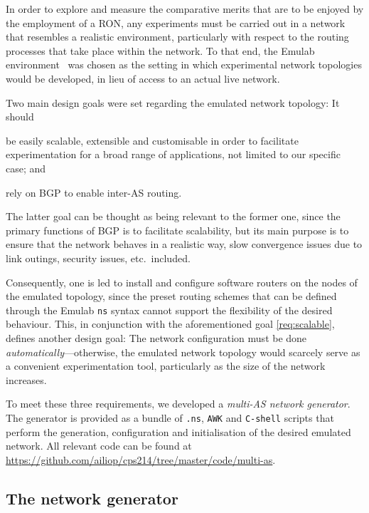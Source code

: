 In order to explore and measure the comparative merits that are to be
enjoyed by the employment of a RON, any experiments must be carried out in
a network that resembles a realistic environment, particularly with respect
to the routing processes that take place within the network. To that end,
the Emulab environment~\cite{Emulab} was chosen as the setting in which
experimental network topologies would be developed, in lieu of access to an
actual live network.

Two main design goals were set regarding the emulated network topology: It
should
\begin{inparaenum}[(a)]
\item \label{req:scalable}
  be easily scalable, extensible and customisable in order to facilitate
  experimentation for a broad range of applications, not limited to our
  specific case; and
\item \label{req:bgp}
  rely on BGP to enable inter-AS routing. 
\end{inparaenum}
The latter goal can be thought as being relevant to the former one, since
the primary functions of BGP is to facilitate scalability, but its main
purpose is to ensure that the network behaves in a realistic way, slow
convergence issues due to link outings, security issues, etc.\ included.

Consequently, one is led to install and configure software routers on the
nodes of the emulated topology, since the preset routing schemes that can
be defined through the Emulab \texttt{ns} syntax cannot support the
flexibility of the desired behaviour. This, in conjunction with the
aforementioned goal \cref{req:scalable}, defines another design goal: The
network configuration must be done \emph{automatically}---otherwise, the
emulated network topology would scarcely serve as a convenient
experimentation tool, particularly as the size of the network increases.

To meet these three requirements, we developed a \emph{multi-AS network
  generator}. The generator is provided as a bundle of \texttt{.ns},
\texttt{AWK} and \texttt{C-shell} scripts that perform the generation,
configuration and initialisation of the desired emulated network. All
relevant code can be found at
\url{https://github.com/ailiop/cps214/tree/master/code/multi-as}.


\subsection{The network generator}
\label{sec:netgen}

